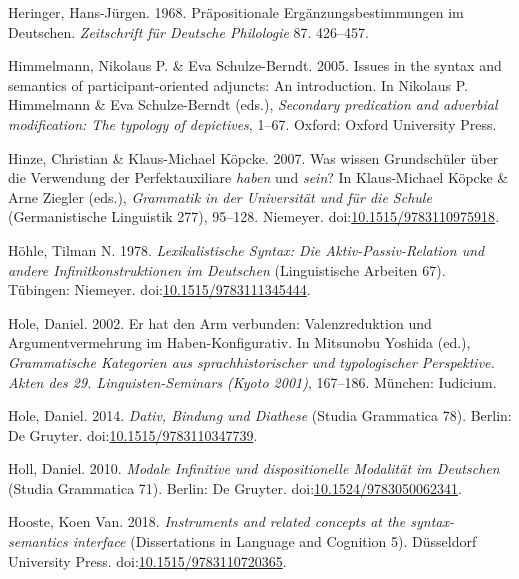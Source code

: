 \leavevmode{}%
Heringer, Hans-Jürgen. 1968. Präpositionale {Ergänzungsbestimmungen} im
{Deutschen}. \emph{Zeitschrift für Deutsche Philologie} 87. 426--457.

\leavevmode{}%
Himmelmann, Nikolaus P. \& Eva Schulze-Berndt. 2005. Issues in the
syntax and semantics of participant-oriented adjuncts: An introduction.
In Nikolaus P. Himmelmann \& Eva Schulze-Berndt (eds.), \emph{Secondary
predication and adverbial modification: The typology of depictives},
1--67. Oxford: Oxford University Press.

\leavevmode{}%
Hinze, Christian \& Klaus-Michael Köpcke. 2007. Was wissen
{Grundschüler} über die {Verwendung} der {Perfektauxiliare} \emph{haben}
und \emph{sein}? In Klaus-Michael Köpcke \& Arne Ziegler (eds.),
\emph{Grammatik in der {Universität} und für die {Schule}}
(Germanistische Linguistik 277), 95--128. Niemeyer.
doi:\href{https://doi.org/10.1515/9783110975918}{10.1515/9783110975918}.

\leavevmode{}%
Höhle, Tilman N. 1978. \emph{Lexikalistische {Syntax}: Die
{Aktiv-Passiv-Relation} und andere {Infinitkonstruktionen} im
{Deutschen}} (Linguistische Arbeiten 67). Tübingen: Niemeyer.
doi:\href{https://doi.org/10.1515/9783111345444}{10.1515/9783111345444}.

\leavevmode{}%
Hole, Daniel. 2002. Er hat den {Arm} verbunden: {Valenzreduktion} und
{Argumentvermehrung} im {Haben}-{Konfigurativ}. In Mitsunobu Yoshida
(ed.), \emph{Grammatische {Kategorien} aus sprachhistorischer und
typologischer {Perspektive}. {Akten} des 29. {Linguisten-Seminars (Kyoto
2001)}}, 167--186. München: Iudicium.

\leavevmode{}%
Hole, Daniel. 2014. \emph{Dativ, {Bindung} und {Diathese}} (Studia
Grammatica 78). Berlin: De Gruyter.
doi:\href{https://doi.org/10.1515/9783110347739}{10.1515/9783110347739}.

\leavevmode{}%
Holl, Daniel. 2010. \emph{Modale {Infinitive} und dispositionelle
{Modalität} im {Deutschen}} (Studia Grammatica 71). Berlin: De Gruyter.
doi:\href{https://doi.org/10.1524/9783050062341}{10.1524/9783050062341}.

\leavevmode{}%
Hooste, Koen Van. 2018. \emph{Instruments and related concepts at the
syntax-semantics interface} (Dissertations in Language and Cognition 5).
Düsseldorf University Press.
doi:\href{https://doi.org/10.1515/9783110720365}{10.1515/9783110720365}.

